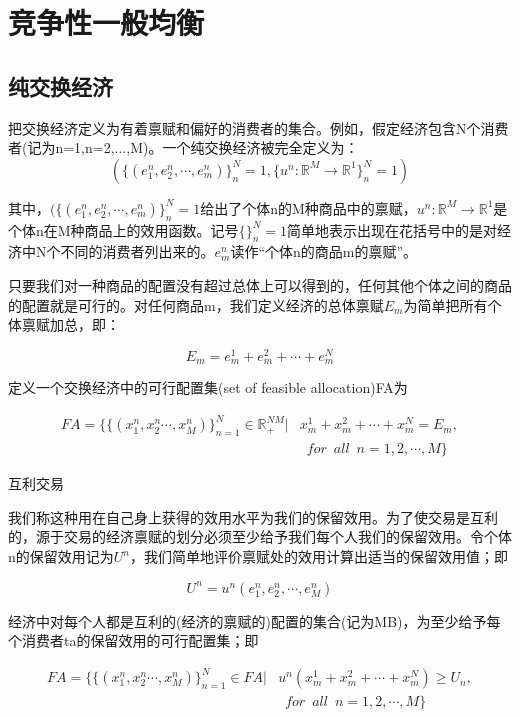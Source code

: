 \documentclass{article}
\begin{document}
\section{竞争性一般均衡}

\subsection{纯交换经济}

把交换经济定义为有着禀赋和偏好的消费者的集合。例如，假定经济包含N个消费者(记为n=1,n=2,...,M)。一个纯交换经济被完全定义为：
\[
(\{(e^n_1,e^n_2,\cdots,e^n_m)\}_n^N=1, \{u^n:\mathbb{R}^M\rightarrow\mathbb{R}^1\}^N_n=1)
\]

其中，$ (\{(e^n_1,e^n_2,\cdots,e^n_m)\}_n^N=1 $给出了个体n的M种商品中的禀赋，$ u^n:\mathbb{R}^M\rightarrow\mathbb{R}^1 $是个体n在M种商品上的效用函数。记号$ \{\}_n^N=1 $简单地表示出现在花括号中的是对经济中N个不同的消费者列出来的。$ e^n_m $读作“个体n的商品m的禀赋”。

只要我们对一种商品的配置没有超过总体上可以得到的，任何其他个体之间的商品的配置就是可行的。对任何商品m，我们定义经济的总体禀赋$ E_m $为简单把所有个体禀赋加总，即：

\[
E_m=e^1_m+e^2_m+\cdots+e^N_m
\]

定义一个交换经济中的可行配置集(set of feasible allocation)FA为

\begin{equation*}
	\begin{split}
	FA=\{\{(x_1^n,x_2^n\cdots,x_M^n)\}^N_{n=1}\in \mathbb{R}^{NM}_+|&x_m^1+x_m^2+\cdots+x_m^N=E_m,\\
	&\enspace for\enspace all\enspace n=1,2,\cdots,M\}
	\end{split}
\end{equation*}

\hspace*{\fill}

互利交易

我们称这种用在自己身上获得的效用水平为我们的保留效用。为了使交易是互利的，源于交易的经济禀赋的划分必须至少给予我们每个人我们的保留效用。令个体n的保留效用记为$ U^n $，我们简单地评价禀赋处的效用计算出适当的保留效用值；即

\[
U^n=u^n(e^n_1,e^n_2,\cdots,e^n_M)
\]

经济中对每个人都是互利的(经济的禀赋的)配置的集合(记为MB)，为至少给予每个消费者ta的保留效用的可行配置集；即

\begin{equation*}
\begin{split}
FA=\{\{(x_1^n,x_2^n\cdots,x_M^n)\}^N_{n=1}\in FA|&u^n(x_m^1+x_m^2+\cdots+x_m^N)\ge U_n,\\
&\enspace for\enspace all\enspace n=1,2,\cdots,M\}
\end{split}
\end{equation*}
\end{document}
